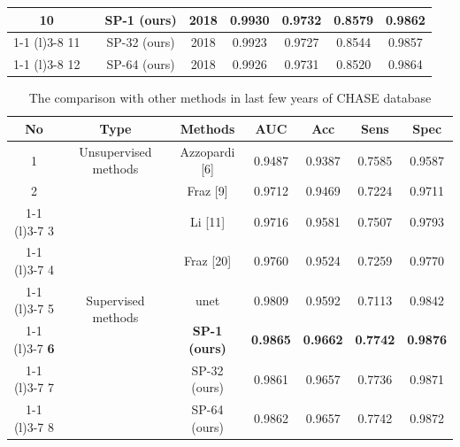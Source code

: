 \documentclass{article}
\begin{document}
\begin{appendices}
\begin{table}[h]
\begin{tabular}{@{}cccccccc@{}}
 \textbf{10}                       &                                       & \textbf{SP-1 (ours)}                     & \textbf{2018}          & \textbf{0.9930} & \textbf{0.9732} & \textbf{0.8579} & \textbf{0.9862}          \\ \cmidrule(r){1-1} \cmidrule(l){3-8} 
11                       &                                       & SP-32 (ours)                    & 2018          & 0.9923          & 0.9727          & 0.8544          & 0.9857          \\ \cmidrule(r){1-1} \cmidrule(l){3-8} 
12                       &                                       & SP-64 (ours)                     & 2018          & 0.9926          & 0.9731          & 0.8520          & 0.9864 \\ \bottomrule
\end{tabular}
\end{table}


\begin{table}[h]
\centering
\caption{The comparison with other methods in last few years of CHASE database}
\label{my-label}
\begin{tabular}{@{}ccccccc@{}}
\toprule
No         & Type                                & Methods              & AUC        & Acc        & Sens       & Spec       \\ \midrule
1          & Unsupervised methods                & Azzopardi {[}6{]}   & 0.9487     & 0.9387     & 0.7585     & 0.9587     \\ \midrule
2          & \multirow{7}{*}{Supervised methods} & Fraz {[}9{]}        & 0.9712     & 0.9469     & 0.7224     & 0.9711     \\ \cmidrule(r){1-1} \cmidrule(l){3-7} 
3          &                                     & Li {[}11{]}          & 0.9716     & 0.9581     & 0.7507     & 0.9793     \\ \cmidrule(r){1-1} \cmidrule(l){3-7} 
4          &                                     & Fraz {[}20{]}        & 0.9760     & 0.9524     & 0.7259     & 0.9770     \\ \cmidrule(r){1-1} \cmidrule(l){3-7} 
5          &                                     & unet        & 0.9809     & 0.9592     & 0.7113     & 0.9842     \\ \cmidrule(r){1-1} \cmidrule(l){3-7} 
\textbf{6} &                                     & \textbf{SP-1 (ours)} & \textbf{0.9865} & \textbf{0.9662} & \textbf{0.7742} & \textbf{0.9876} \\ \cmidrule(r){1-1} \cmidrule(l){3-7} 
7          &                                     & SP-32 (ours)         & 0.9861          & 0.9657          & 0.7736          & 0.9871          \\ \cmidrule(r){1-1} \cmidrule(l){3-7} 
8          &                                     & SP-64 (ours)         & 0.9862          & 0.9657          & 0.7742          & 0.9872          \\ \bottomrule
\end{tabular}
\end{table}


\end{appendices}
\end{document}
